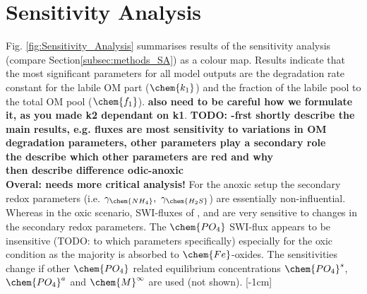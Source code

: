 \documentclass[gmd, manuscript]{copernicus}
\begin{document}
\section{Sensitivity Analysis}\label{subsec:SA}
Fig. \ref{fig:Sensitivity_Analysis} summarises results of the sensitivity analysis (compare Section\ref{subsec:methods_SA}) as a colour map. 
Results indicate that the most significant parameters for all model outputs are the degradation rate constant for the labile OM part ($\chem{k_1}$) and the fraction of the labile pool to the total OM pool ($\chem{f_1}$). \textbf{also need to be careful how we formulate it, as you made k2 dependant on k1}. 
\textbf{TODO: -frst shortly describe the main results, e.g. fluxes are most sensitivity to variations in OM degradation parameters, other parameters play a secondary role\\
the describe which other parameters are red and why\\
then describe difference odic-anoxic\\
Overal: needs more critical analysis!}
For the anoxic setup the secondary redox parameters (i.e. $\gamma_\chem{NH_4},\ \gamma_\chem{H_2S}$) are essentially non-influential. 
Whereas in the oxic scenario, SWI-fluxes of ,  and  are very sensitive to changes in the secondary redox parameters. %
The $\chem{PO_4}$ SWI-flux appears to be insensitive (TODO: to which parameters specifically) especially for the oxic condition as the majority is absorbed to $\chem{Fe}$-oxides. The sensitivities change 
if other $\chem{PO_4}$ related equilibrium concentrations $\chem{PO_4}^s$, $\chem{PO_4}^a$ and $\chem{M}^\infty$ are used (not shown).
[-1cm]%
\end{document}
